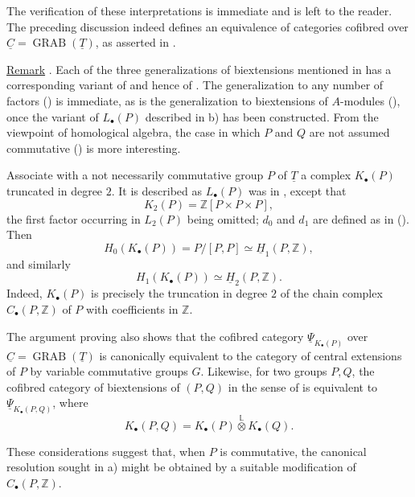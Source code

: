 The verification of these interpretations is immediate and is left
to the reader.  The preceding discussion indeed defines an
equivalence of categories cofibred over
$\underline C=\operatorname{GRAB}(\underline T)$, as asserted in
.

\underline{Remark} . Each of the three generalizations of
biextensions mentioned in  has a corresponding variant of 
and hence of .  The generalization to any number of factors
() is immediate, as is the generalization to biextensions of
$A$-modules (), once the variant of $L_\bullet(P)$ described
in  b) has been constructed.  From the viewpoint of
homological algebra, the case in which $P$ and $Q$ are not assumed
commutative () is more interesting.

Associate with a not necessarily commutative group $P$ of
$\underline T$ a complex $K_\bullet(P)$ truncated in degree $2$.
It is described as $L_\bullet(P)$ was in , except that
\[
 K_2(P)=\mathbb Z[P\times P\times P],
\]
the first factor occurring in $L_2(P)$ being omitted; $d_0$ and
$d_1$ are defined as in ().  Then
\[
 H_0(K_\bullet(P))=P/[P,P]
 \simeq\underline H_1(P,\mathbb Z),
\]
and similarly
\[
 H_1(K_\bullet(P))\simeq\underline H_2(P,\mathbb Z).
\]
Indeed, $K_\bullet(P)$ is precisely the truncation in degree $2$ of
the chain complex $C_\bullet(P,\mathbb Z)$ of $P$ with coefficients
in $\mathbb Z$.

The argument proving  also shows that the cofibred category
$\underline\Psi_{K_\bullet(P)}$ over
$\underline C=\operatorname{GRAB}(\underline T)$ is canonically
equivalent to the category of central extensions of $P$ by variable
commutative groups $G$.  Likewise, for two groups $P,Q$, the
cofibred category of biextensions of $(P,Q)$ in the sense of 
is equivalent to $\underline\Psi_{K_\bullet(P,Q)}$, where
\[
 K_\bullet(P,Q)
 =
 K_\bullet(P)\mathbin{\overset{\mathbb L}{\otimes}}K_\bullet(Q).
\]

These considerations suggest that, when $P$ is commutative, the
canonical resolution sought in  a) might be obtained by a
suitable modification of $C_\bullet(P,\mathbb Z)$.
